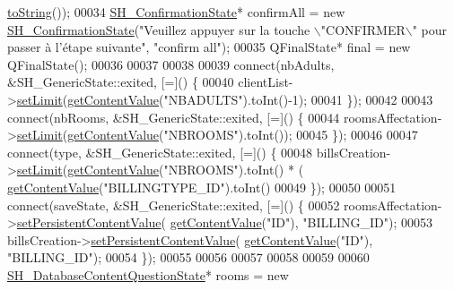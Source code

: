 \begin{DoxyCode}
      \hyperlink{classSH__InOutStateMachine_a60ecd7de03d948e2d1e9cbedb5c3e5fa}{toString}());
00034     \hyperlink{classSH__ConfirmationState}{SH\_ConfirmationState}* confirmAll = \textcolor{keyword}{new} 
      \hyperlink{classSH__ConfirmationState}{SH\_ConfirmationState}(\textcolor{stringliteral}{"Veuillez appuyer sur la touche \(\backslash\)"CONFIRMER\(\backslash\)" pour passer à
       l'étape suivante"}, \textcolor{stringliteral}{"confirm all"});
00035     QFinalState* \textcolor{keyword}{final} = \textcolor{keyword}{new} QFinalState();
00036 
00037 
00038 
00039     connect(nbAdults, &SH\_GenericState::exited, [=]() \{
00040         clientList->\hyperlink{classSh__LoopingInOutStateMachine_ab5e9ac94cbd9a47a45dcb50e777c398b}{setLimit}(\hyperlink{classSH__InOutStateMachine_a2cdd914f1e597ac52d021106eec75c89}{getContentValue}(\textcolor{stringliteral}{"NBADULTS"}).toInt()-1);
00041     \});
00042 
00043     connect(nbRooms, &SH\_GenericState::exited, [=]() \{
00044         roomsAffectation->\hyperlink{classSh__LoopingInOutStateMachine_ab5e9ac94cbd9a47a45dcb50e777c398b}{setLimit}(\hyperlink{classSH__InOutStateMachine_a2cdd914f1e597ac52d021106eec75c89}{getContentValue}(\textcolor{stringliteral}{"NBROOMS"}).toInt());
00045     \});
00046 
00047     connect(type, &SH\_GenericState::exited, [=]() \{
00048         billsCreation->\hyperlink{classSh__LoopingInOutStateMachine_ab5e9ac94cbd9a47a45dcb50e777c398b}{setLimit}(\hyperlink{classSH__InOutStateMachine_a2cdd914f1e597ac52d021106eec75c89}{getContentValue}(\textcolor{stringliteral}{"NBROOMS"}).toInt() * (
      \hyperlink{classSH__InOutStateMachine_a2cdd914f1e597ac52d021106eec75c89}{getContentValue}(\textcolor{stringliteral}{"BILLINGTYPE\_ID"}).toInt() %
00049     \});
00050 
00051     connect(saveState, &SH\_GenericState::exited, [=]() \{
00052         roomsAffectation->\hyperlink{classSh__LoopingInOutStateMachine_aa7d8c9cc870607ed9ef75319bff88500}{setPersistentContentValue}(
      \hyperlink{classSH__InOutStateMachine_a2cdd914f1e597ac52d021106eec75c89}{getContentValue}(\textcolor{stringliteral}{"ID"}), \textcolor{stringliteral}{"BILLING\_ID"});
00053         billsCreation->\hyperlink{classSh__LoopingInOutStateMachine_aa7d8c9cc870607ed9ef75319bff88500}{setPersistentContentValue}(
      \hyperlink{classSH__InOutStateMachine_a2cdd914f1e597ac52d021106eec75c89}{getContentValue}(\textcolor{stringliteral}{"ID"}), \textcolor{stringliteral}{"BILLING\_ID"});
00054     \});
00055 
00056 
00057 
00058 
00059 
00060     \hyperlink{classSH__DatabaseContentQuestionState}{SH\_DatabaseContentQuestionState}* rooms = \textcolor{keyword}{new} 

\end{DoxyCode}
